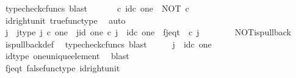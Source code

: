 \begin{isabellebody}
\ {\isacharparenleft}{\kern0pt}typecheck{\isacharunderscore}{\kern0pt}cfuncs{\isacharcomma}{\kern0pt}\ blast{\isacharparenright}{\kern0pt}\isanewline
\ \ \isamarkupfalse%
\ \isamarkupfalse%
\ {\isachardoublequoteopen}{\isasymt}\ {\isasymcirc}\isactrlsub c\ id\isactrlsub c\ one\ {\isacharequal}{\kern0pt}\ NOT\ {\isasymcirc}\isactrlsub c\ {\isasymt}{\isachardoublequoteclose}\isanewline
\ \ \ \ \isamarkupfalse%
\ id{\isacharunderscore}{\kern0pt}right{\isacharunderscore}{\kern0pt}unit{}\ true{\isacharunderscore}{\kern0pt}func{\isacharunderscore}{\kern0pt}type\ \isamarkupfalse%
\ auto\isanewline
\ \ \isamarkupfalse%
\ \isamarkupfalse%
\ j\ \ j{\isacharunderscore}{\kern0pt}type{\isacharcolon}{\kern0pt}\ {\isachardoublequoteopen}j\ {\isasymin}\isactrlsub c\ one{\isachardoublequoteclose}\ \ j{\isacharunderscore}{\kern0pt}id{\isacharcolon}{\kern0pt}\ {\isachardoublequoteopen}{\isasymbeta}\isactrlbsub one\isactrlesub \ {\isasymcirc}\isactrlsub c\ j\ {\isacharequal}{\kern0pt}\ id\isactrlsub c\ one{\isachardoublequoteclose}\ \ f{\isacharunderscore}{\kern0pt}j{\isacharunderscore}{\kern0pt}eq{\isacharunderscore}{\kern0pt}t{\isacharcolon}{\kern0pt}\ {\isachardoublequoteopen}{\isasymf}\ {\isasymcirc}\isactrlsub c\ j\ {\isacharequal}{\kern0pt}\ {\isasymt}{\isachardoublequoteclose}\isanewline
\ \ \ \ \isamarkupfalse%
\ NOT{\isacharunderscore}{\kern0pt}is{\isacharunderscore}{\kern0pt}pullback\ \isamarkupfalse%
\ is{\isacharunderscore}{\kern0pt}pullback{\isacharunderscore}{\kern0pt}def\ \isamarkupfalse%
\ {\isacharparenleft}{\kern0pt}typecheck{\isacharunderscore}{\kern0pt}cfuncs{\isacharcomma}{\kern0pt}\ blast{\isacharparenright}{\kern0pt}\isanewline
\ \ \isamarkupfalse%
\ \isamarkupfalse%
\ {\isachardoublequoteopen}j\ {\isacharequal}{\kern0pt}\ id\isactrlsub c\ one{\isachardoublequoteclose}\isanewline
\ \ \ \ \isamarkupfalse%
\ id{\isacharunderscore}{\kern0pt}type\ one{\isacharunderscore}{\kern0pt}unique{\isacharunderscore}{\kern0pt}element\ \isamarkupfalse%
\ blast\isanewline
\ \ \isamarkupfalse%
\ \isamarkupfalse%
\ {\isachardoublequoteopen}{\isasymf}\ {\isacharequal}{\kern0pt}\ {\isasymt}{\isachardoublequoteclose}\isanewline
\ \ \ \ \isamarkupfalse%
\ f{\isacharunderscore}{\kern0pt}j{\isacharunderscore}{\kern0pt}eq{\isacharunderscore}{\kern0pt}t\ false{\isacharunderscore}{\kern0pt}func{\isacharunderscore}{\kern0pt}type\ id{\isacharunderscore}{\kern0pt}right{\isacharunderscore}{\kern0pt}unit{}\ \isamarkupfalse%

\end{isabellebody}
